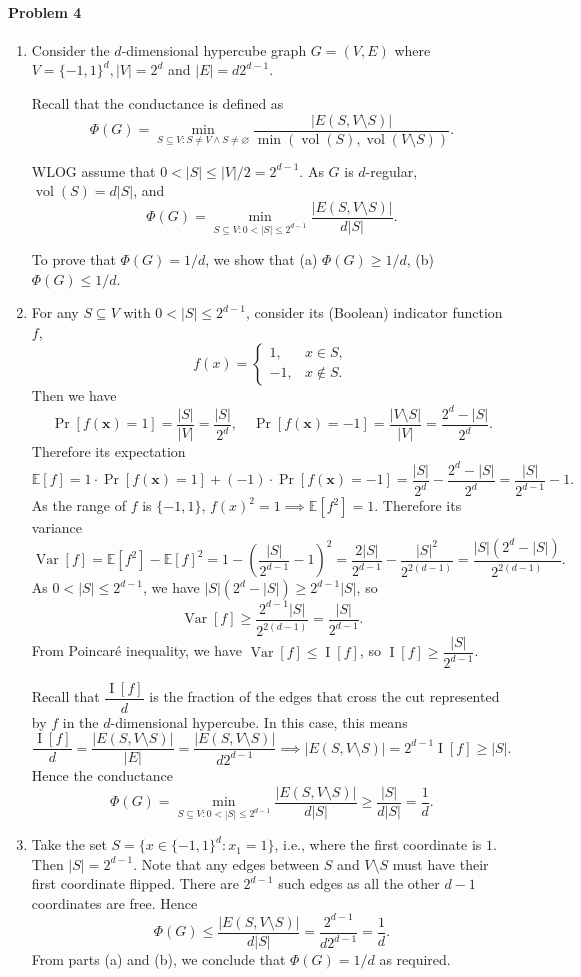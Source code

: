 \documentclass[12pt]{article}
\newcommand{\x}{\bm{x}}
\newcommand{\E}{\mathbb{E}}
\DeclareMathOperator{\I}{I}
\DeclareMathOperator{\V}{Var}
\DeclareMathOperator{\vol}{vol}
\begin{document}
\paragraph{Problem 4}
\begin{enumerate}[label=\alph*., font=\bfseries]
\item[] Consider the $d$-dimensional hypercube graph $G=(V, E)$ where $V=\{-1,1\}^d, |V|=2^d$ and $|E|=d2^{d-1}$.

Recall that the conductance is defined as $$\Phi(G)=\min_{S\subseteq V:S\ne V\land S\ne\varnothing}\frac{|E(S,V\setminus S)|}{\min(\vol(S),\vol(V\setminus S))}.$$

WLOG assume that $0<|S|\le|V|/2=2^{d-1}$. As $G$ is $d$-regular, $\vol(S)=d|S|$, and $$\Phi(G)=\min_{S\subseteq V:0<|S|\le2^{d-1}}\frac{|E(S,V\setminus S)|}{d|S|}.$$

To prove that $\Phi(G)=1/d$, we show that (a) $\Phi(G)\ge 1/d$, (b) $\Phi(G)\le 1/d$.
\item For any $S\subseteq V$ with $0<|S|\le2^{d-1}$, consider its (Boolean) indicator function $f$, $$f(x)=\begin{cases}1,&x\in S,\\-1,&x\notin S.\end{cases}$$
Then we have $$\Pr[f(\x)=1]=\frac{|S|}{|V|}=\frac{|S|}{2^d},\quad\Pr[f(\x)=-1]=\frac{|V\setminus S|}{|V|}=\frac{2^d-|S|}{2^d}.$$
Therefore its expectation
$$\E[f]=1\cdot\Pr[f(\x)=1]+(-1)\cdot\Pr[f(\x)=-1]=\frac{|S|}{2^d}-\frac{2^d-|S|}{2^d}=\frac{|S|}{2^{d-1}}-1.$$
As the range of $f$ is $\{-1,1\}$, $f(x)^2=1\implies\E\left[f^2\right]=1$. Therefore its variance
$$\V[f]=\E\left[f^2\right]-\E[f]^2=1-\left(\frac{|S|}{2^{d-1}}-1\right)^2=\frac{2|S|}{2^{d-1}}-\frac{|S|^2}{2^{2(d-1)}}=\frac{|S|\left(2^d-|S|\right)}{2^{2(d-1)}}.$$
As $0<|S|\le2^{d-1}$, we have $|S|\left(2^d-|S|\right)\ge 2^{d-1}|S|$, so
$$\V[f]\ge\frac{2^{d-1}|S|}{2^{2(d-1)}}=\frac{|S|}{2^{d-1}}.$$
From Poincar\'{e} inequality, we have $\V[f]\le\I[f]$, so
$\I[f]\ge\dfrac{|S|}{2^{d-1}}$.

Recall that $\dfrac{\I[f]}{d}$ is the fraction of the edges that cross the cut represented by $f$ in the $d$-dimensional hypercube. In this case, this means
$$\frac{\I[f]}{d}=\frac{|E(S,V\setminus S)|}{|E|}=\frac{|E(S,V\setminus S)|}{d2^{d-1}}\implies|E(S,V\setminus S)|=2^{d-1}\I[f]\ge|S|.$$
Hence the conductance
$$\Phi(G)=\min_{S\subseteq V:0<|S|\le2^{d-1}}\frac{|E(S,V\setminus S)|}{d|S|}\ge\frac{|S|}{d|S|}=\frac{1}{d}.$$
\item Take the set $S=\{x\in\{-1,1\}^d:x_1=1\}$, i.e., where the first coordinate is $1$. Then $|S|=2^{d-1}$. Note that any edges between $S$ and $V\setminus S$ must have their first coordinate flipped. There are $2^{d-1}$ such edges as all the other $d-1$ coordinates are free. Hence
$$\Phi(G)\le\frac{|E(S,V\setminus S)|}{d|S|}=\frac{2^{d-1}}{d2^{d-1}}=\frac{1}{d}.$$
From parts (a) and (b), we conclude that $\Phi(G)=1/d$ as required.
\end{enumerate}
\end{document}
